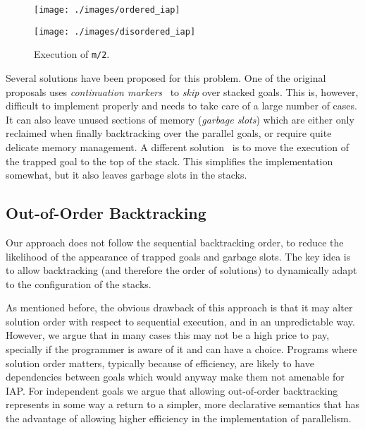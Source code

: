 \documentclass{tlp}
\newcommand{\compressection}{\vspace{-1em}}
\newcommand{\compressfigure}{\vspace{-1em}}
\begin{document}
\begin{figure}[tb]
  \begin{minipage}[b]{0.67\linewidth}
    \texttt{[image: ./images/ordered\_iap]}
    \caption{Execution of \lstinline{m/3}.}
  \label{fig:ordered_iap}
  \end{minipage}
  \hfill 
  \begin{minipage}[b]{0.28\linewidth}
    \texttt{[image: ./images/disordered\_iap]}
    \caption{Execution of \lstinline{m/2}.}
  \label{fig:disordered_iap}
  \end{minipage}
\compressfigure
\end{figure}


Several solutions have been proposed for this problem.  One of
the original proposals uses \emph{continuation
  markers}~\cite{hermenegildo-phd-short,flexmem-europar96} to
\emph{skip} over stacked goals. 
This is, however, difficult to implement properly and needs to take
care of a large number of cases.  It can also leave unused
sections of memory (\emph{garbage slots}) which are either only
reclaimed when finally backtracking over the parallel goals, or
require quite delicate memory management.
A different solution~\cite{hlfullandpar-iclp2008} is to move the
execution 
of the trapped goal to the top of the stack.  This simplifies the
implementation somewhat, but it also leaves garbage slots in the
stacks.  


\compressection
\subsection{Out-of-Order Backtracking}
\label{sec:out-of-order-back}

Our approach does not follow the sequential backtracking order, to
reduce the likelihood of the appearance of trapped goals and garbage
slots.  The key idea is to allow backtracking (and therefore the
order of solutions) to dynamically adapt to the configuration of the
stacks.

As mentioned before, the obvious drawback of this approach is that it
may alter solution 
order with respect to sequential execution, and in an unpredictable
way.  However, we argue that in many cases this may  not be a high
price to pay, specially if the programmer is aware of it and can have
a choice. 
Programs where solution order matters, typically because of
efficiency, are likely to have dependencies between goals which would
anyway make them not amenable for IAP.
For independent goals we argue that allowing out-of-order backtracking
represents in some way a return to a simpler, more declarative
semantics that has the advantage of allowing higher efficiency in the
implementation of parallelism.
\end{document}

